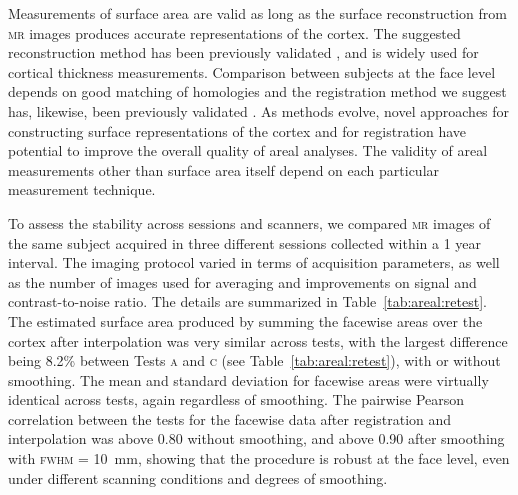 Measurements of surface area are valid as long as the surface reconstruction from \textsc{mr} images produces accurate representations of the cortex. The suggested reconstruction method has been previously validated \citep{Fischl2000}, and is widely used for cortical thickness measurements. Comparison between subjects at the face level depends on good matching of homologies and the registration method we suggest has, likewise, been previously validated \citep{Yeo2010, Klein2010}. As methods evolve, novel approaches for constructing surface representations of the cortex and for registration have potential to improve the overall quality of areal analyses. The validity of areal measurements other than surface area itself depend on each particular measurement technique.

To assess the stability across sessions and scanners, we compared \textsc{mr} images of the same subject acquired in three different sessions collected within a 1 year interval. The imaging protocol varied in terms of acquisition parameters, as well as the number of images used for averaging and improvements on signal and contrast-to-noise ratio. The details are summarized in Table~\ref{tab:areal:retest}. The estimated surface area produced by summing the facewise areas over the cortex after interpolation was very similar across tests, with the largest difference being 8.2\% between Tests \textsc{a} and \textsc{c} (see Table~\ref{tab:areal:retest}), with or without smoothing. The mean and standard deviation for facewise areas were virtually identical across tests, again regardless of smoothing. The pairwise Pearson correlation between the tests for the facewise data after registration and interpolation was above 0.80 without smoothing, and above 0.90 after smoothing with \textsc{fwhm} = 10~mm, showing that the procedure is robust at the face level, even under different scanning conditions and degrees of smoothing.

